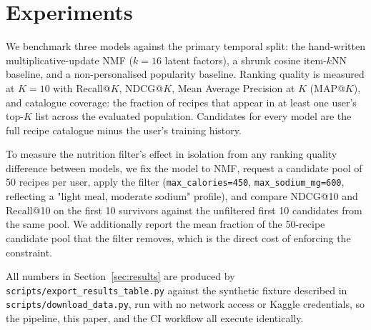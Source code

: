 \section{Experiments}
We benchmark three models against the primary temporal split: the
hand-written multiplicative-update NMF ($k=16$ latent factors), a shrunk
cosine item-$k$NN baseline, and a non-personalised popularity baseline.
Ranking quality is measured at $K=10$ with Recall@$K$, NDCG@$K$, Mean
Average Precision at $K$ (MAP@$K$), and catalogue coverage: the fraction of
recipes that appear in at least one user's top-$K$ list across the
evaluated population. Candidates for every model are the full recipe
catalogue minus the user's training history.

To measure the nutrition filter's effect in isolation from any ranking
quality difference between models, we fix the model to NMF, request a
candidate pool of 50 recipes per user, apply the filter
(\texttt{max\_calories=450}, \texttt{max\_sodium\_mg=600}, reflecting a
"light meal, moderate sodium" profile), and compare NDCG@10 and Recall@10
on the first 10 survivors against the unfiltered first 10 candidates from
the same pool. We additionally report the mean fraction of the 50-recipe
candidate pool that the filter removes, which is the direct cost of
enforcing the constraint.

All numbers in Section~\ref{sec:results} are produced by
\texttt{scripts/export\_results\_table.py} against the synthetic fixture
described in \texttt{scripts/download\_data.py}, run with no network access
or Kaggle credentials, so the pipeline, this paper, and the CI workflow all
execute identically.

